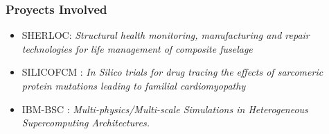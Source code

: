 \documentclass[usenames,dvipsnames]{beamer}
\begin{document}

\begin{frame}
\frametitle{Proyects Involved}
\begin{itemize}
\item \textcolor{OliveGreen}{SHERLOC}: \textit{Structural health monitoring, manufacturing and repair technologies for life management of composite fuselage}
\vspace{1cm}
\item SILICOFCM : \textit{In Silico trials for drug tracing the effects of sarcomeric protein mutations leading to familial cardiomyopathy}
\item IBM-BSC : \textit{Multi-physics/Multi-scale Simulations in Heterogeneous Supercomputing Architectures.}
\end{itemize}
\end{frame}

\end{document}
